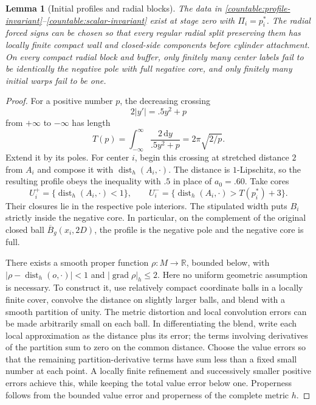 \documentclass[11pt]{article}
\numberwithin{equation}{section}
\newtheorem{lemma}[theorem]{Lemma}
\theoremstyle{definition}
\theoremstyle{remark}
\begin{document}
\begin{lemma}[Initial profiles and radial blocks]\label{countable:initial}
The data in \eqref{countable:profile-invariant}--\eqref{countable:scalar-invariant}
exist at stage zero with $\Pi_i=p_i^*$. The radial forced signs can be
chosen so that every regular radial split preserving them has locally
finite compact wall and closed-side components before cylinder
attachment. On every compact radial block and buffer, only finitely
many center labels fail to be identically the negative pole with full
negative core, and only finitely many initial warps fail to be one.
\end{lemma}

\begin{proof}
For a positive number $p$, the decreasing crossing
\[
 2|y'|=.5y^2+p
\]
from $+\infty$ to $-\infty$ has length
\[
 T(p)=\int_{-\infty}^{\infty}\frac{2\,\mathrm d y}{.5y^2+p}
      =2\pi\sqrt{2/p}.
\]
Extend it by its poles. For center $i$, begin this crossing at stretched
distance $2$ from $A_i$ and compose it with $\operatorname{dist}_h(A_i,\cdot)$.
The distance is $1$-Lipschitz, so the resulting profile obeys the
inequality with $.5$ in place of $a_0=.60$. Take cores
\[
 U_i^+=\{\operatorname{dist}_h(A_i,\cdot)<1\},\qquad
 U_i^-=\{\operatorname{dist}_h(A_i,\cdot)>T(p_i^*)+3\}.
\]
Their closures lie in the respective pole interiors. The stipulated
width puts $B_i$ strictly inside the negative core. In particular, on
the complement of the original closed ball $\overline B_g(x_i,2D)$,
the profile is the negative pole and the negative core is full.

There exists a smooth proper function $\rho:M\to\mathbb R$, bounded below,
with $|\rho-\operatorname{dist}_h(o,\cdot)|<1$ and $|\operatorname{grad}\rho|_h\le2$.
Here no uniform geometric assumption is necessary. To construct it,
use relatively compact coordinate balls in a locally finite cover,
convolve the distance on slightly larger balls, and blend with a
smooth partition of unity. The metric distortion and local convolution
errors can be made arbitrarily small on each ball. In differentiating
the blend, write each local approximation as the distance plus its
error; the terms involving derivatives of the partition sum to zero
on the common distance. Choose the value errors so that the remaining
partition-derivative terms have sum less than a fixed small number at
each point. A locally finite refinement and successively smaller
positive errors achieve this, while keeping the total value error
below one. Properness follows from the bounded value error and
properness of the complete metric $h$.


\end{proof}
\end{document}
